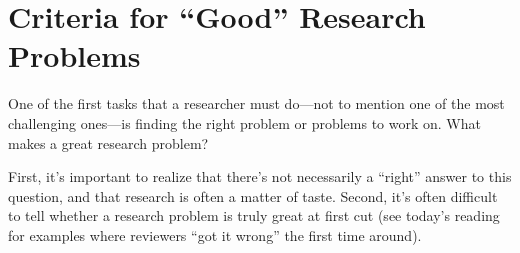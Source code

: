 




\section{Criteria for ``Good'' Research Problems}

One of the first tasks that a researcher must do---not to mention one of
the most challenging ones---is finding the right problem or problems to
work on.  What makes a great research problem?  

First, it's important to realize that there's not necessarily a
``right'' answer to this question, and that research is often a matter
of taste.  Second, it's often difficult to tell whether a research
problem is truly great at first cut (see today's reading for examples
where reviewers ``got it wrong'' the first time around).

